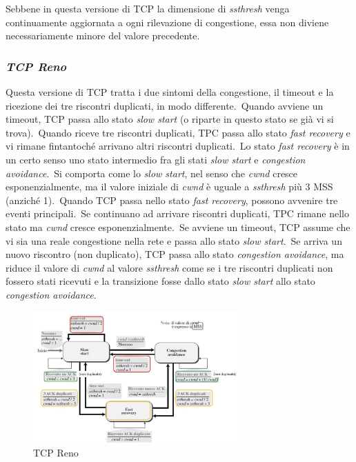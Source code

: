 Sebbene in questa versione di TCP la dimensione di \emph{ssthresh} venga continuamente aggiornata a ogni rilevazione di congestione, essa non diviene necessariamente minore del valore precedente.

\subsubsection{\emph{TCP Reno}}

Questa versione di TCP tratta i due sintomi della congestione, il timeout e la ricezione dei tre riscontri duplicati, in modo differente.\
Quando avviene un timeout, TCP passa allo stato \emph{slow start} (o riparte in questo stato se già vi si trova).\
Quando riceve tre riscontri duplicati, TPC passa allo stato \emph{fast recovery} e vi rimane fintantoché arrivano altri riscontri duplicati.\
Lo stato \emph{fast recovery} è in un certo senso uno stato intermedio fra gli stati \emph{slow start} e \emph{congestion avoidance}.\
Si comporta come lo \emph{slow start}, nel senso che \emph{cwnd} cresce esponenzialmente, ma il valore iniziale di \emph{cwnd} è uguale a \emph{ssthresh} più 3 MSS (anziché 1).\
Quando TCP passa nello stato \emph{fast recovery}, possono avvenire tre eventi principali.\
Se continuano ad arrivare riscontri duplicati, TPC rimane nello stato ma \emph{cwnd} cresce esponenzialmente.\
Se avviene un timeout, TCP assume che vi sia una reale congestione nella rete e passa allo stato \emph{slow start}.\
Se arriva un nuovo riscontro (non duplicato), TCP passa allo stato \emph{congestion avoidance}, ma riduce il valore di \emph{cwnd} al valore \emph{ssthresh} come se i tre riscontri duplicati non fossero stati ricevuti e la transizione fosse dallo stato \emph{slow start} allo stato \emph{congestion avoidance}.

\begin{figure}[H]
    \centering
    \includegraphics[width=0.7\textwidth]{immagini/TCP_Reno.jpg}
    \caption*{TCP Reno}
\end{figure}

